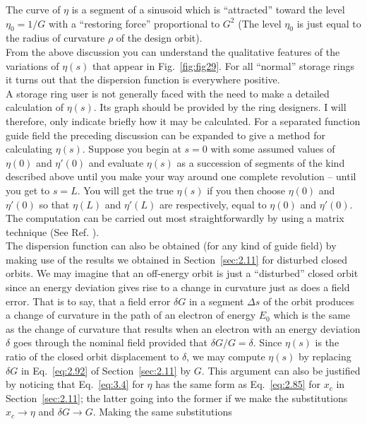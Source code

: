 The curve of $\eta$ is a segment of a sinusoid which is ``attracted'' toward the level
$\eta_0 = 1/G$ with a ``restoring force'' proportional to $G^2$ (The level $\eta_0$ is just equal
to the radius of curvature $\rho$ of the design orbit).\\
From the above discussion you can understand the qualitative features of the variations
 of $\eta(s)$ that appear in Fig.~\ref{fig:fig29}. For all ``normal'' storage rings it turns
out that the dispersion function is everywhere positive.\\
A storage ring user is not generally faced with the need to make a detailed calculation of $\eta(s)$. Its graph should be provided by the ring designers. I will therefore, only indicate briefly how it may be calculated. For a separated function guide field the preceding discussion can be expanded to give a method for calculating $\eta(s)$. Suppose you begin at $s = 0$ with some assumed values of $\eta(0)$ and $\eta'(0)$ and evaluate $\eta(s)$ as a succession of segments of the kind described above until you make your way around one complete revolution -- until you get to $s = L$. You will get the true $\eta(s)$ if you then choose $\eta(0)$ and $\eta'(0)$ so that $\eta(L)$ and $\eta'(L)$ are respectively, equal to $\eta(0)$ and $\eta'(0)$. The computation can be carried out most straightforwardly by using a matrix technique (See Ref. \cite{11}).\\
The dispersion function can also be obtained (for any kind of guide field) by making use of the results we obtained in Section~\ref{sec:2.11} for disturbed closed orbits. We may imagine that an off-energy orbit is just a ``disturbed'' closed orbit since an energy deviation gives rise to a change in curvature just as does a field error. That is to say, that a field error $\delta G$ in a segment $\Delta s$ of the orbit produces a change of curvature in the path of an electron of energy $E_0$ which is the same as the change of curvature that results when an electron with an energy deviation $\delta$ goes through the nominal field provided that $\delta G/G = \delta$. Since $\eta(s)$ is the ratio of the closed orbit displacement to $\delta$, we may compute $\eta(s)$ by replacing $\delta G$ in Eq.~\eqref{eq:2.92} of Section~\ref{sec:2.11} by $G$. This argument can also be justified by noticing that Eq.~\eqref{eq:3.4} for $\eta$ has the same form as Eq.~\eqref{eq:2.85} for $x_c$ in Section~\ref{sec:2.11}; the latter going into the former
 if we make the substitutions $x_c \to \eta$ and $\delta G \to G$. Making the same substitutions
